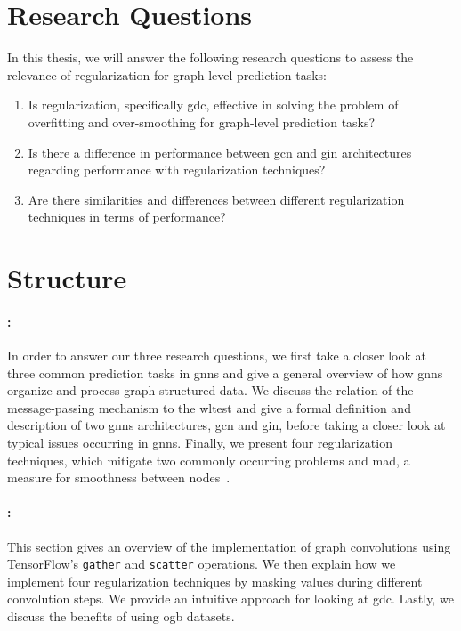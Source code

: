 \section{Research Questions}%
\label{sec:intro:questions}
In this thesis, we will answer the following research questions to assess the relevance of regularization for graph-level prediction tasks:
\begin{enumerate}
    \item Is regularization, specifically \ac{gdc}, effective in solving the problem of overfitting and over-smoothing for graph-level prediction tasks?
    \item Is there a difference in performance between \ac{gcn} and \ac{gin} architectures regarding performance with regularization techniques?
    \item Are there similarities and differences between different regularization techniques in terms of performance?
\end{enumerate}
\section{Structure}%
\label{sec:intro:structure}

\paragraph{: }
In order to answer our three research questions, we first take a closer look at three common prediction tasks in \acp{gnn}
and give a general overview of how \acp{gnn} organize and process graph-structured data.
We discuss the relation of the message-passing mechanism to the \ac{wl}test and give a formal definition and description of two \acp{gnn} architectures, \ac{gcn} and \ac{gin}, before taking a closer look at typical issues occurring in \acp{gnn}.
Finally, we present four regularization techniques, which mitigate two commonly occurring problems and \acf{mad}, a measure for smoothness between nodes~\cite{Chen2020}.
\paragraph{: }
This section gives an overview of the implementation of graph convolutions using TensorFlow's \texttt{gather} and \texttt{scatter} operations.
We then explain how we implement four regularization techniques by masking values during different convolution steps.
We provide an intuitive approach for looking at \ac{gdc}.
Lastly, we discuss the benefits of using \ac{ogb} datasets.
